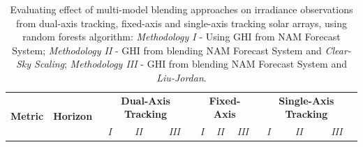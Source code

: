 \begin{table}[h]
\begin{center}
    \caption[Evaluating effect of multi-model blending approaches using GHI, on irradiance observations from dual-axis tracking, fixed-axis and single-axis tracking solar arrays, using random forests algorithm.]{Evaluating effect of multi-model blending approaches on irradiance observations from dual-axis tracking, fixed-axis and single-axis tracking solar arrays, using random forests algorithm: \textit{Methodology I} - Using GHI from NAM Forecast System; \textit{Methodology II} - GHI from blending NAM Forecast System and \textit{Clear-Sky Scaling}; \textit{Methodology III} - GHI from blending NAM Forecast System and \textit{Liu-Jordan}.}
    \label{Tab:mmb_array_abe1}
    \begin{tabular}{@{}ccccccccccc@{}}
    \toprule
    \multirow{2}{*}{\textbf{Metric}} & \multirow{2}{*}{\textbf{Horizon}} & \multicolumn{3}{c}{\textbf{Dual-Axis Tracking}} & \multicolumn{3}{c}{\textbf{Fixed-Axis}} & \multicolumn{3}{c}{\textbf{Single-Axis Tracking}}\\
    \cmidrule{3-11}
     &  & \textit{I} & \textit{II} & \textit{III} & \textit{I} & \textit{II} & \textit{III} & \textit{I} & \textit{II} & \textit{III} \\
    

\end{tabular}
\end{center}
\end{table}
